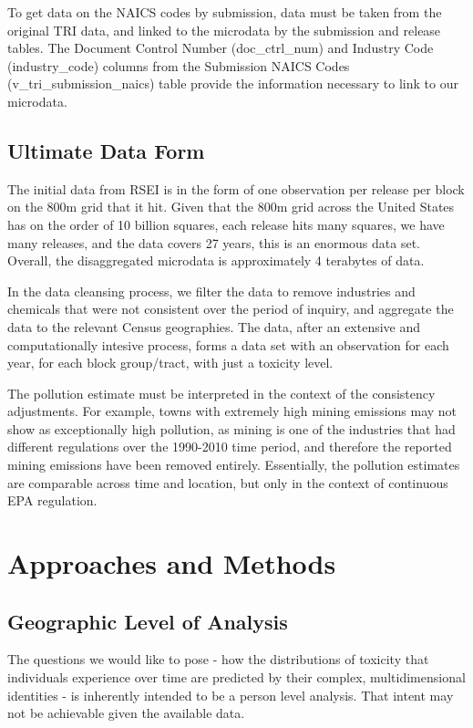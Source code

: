 \documentclass[12pt,twoside]{dukestatscithesis}
\theoremstyle{definition}
\theoremstyle{definition}
\theoremstyle{definition}
\theoremstyle{remark}
\begin{document}
To get data on the NAICS codes by submission, data must be taken from
the original TRI data, and linked to the microdata by the submission and
release tables. The Document Control Number (doc\_ctrl\_num) and
Industry Code (industry\_code) columns from the Submission NAICS Codes
(v\_tri\_submission\_naics) table provide the information necessary to
link to our microdata.

\section{Ultimate Data Form}\label{ultimate-data-form}

The initial data from RSEI is in the form of one observation per release
per block on the 800m grid that it hit. Given that the 800m grid across
the United States has on the order of 10 billion squares, each release
hits many squares, we have many releases, and the data covers 27 years,
this is an enormous data set. Overall, the disaggregated microdata is
approximately 4 terabytes of data.

In the data cleansing process, we filter the data to remove industries
and chemicals that were not consistent over the period of inquiry, and
aggregate the data to the relevant Census geographies. The data, after
an extensive and computationally intesive process, forms a data set with
an observation for each year, for each block group/tract, with just a
toxicity level.

The pollution estimate must be interpreted in the context of the
consistency adjustments. For example, towns with extremely high mining
emissions may not show as exceptionally high pollution, as mining is one
of the industries that had different regulations over the 1990-2010 time
period, and therefore the reported mining emissions have been removed
entirely. Essentially, the pollution estimates are comparable across
time and location, but only in the context of continuous EPA regulation.

\chapter{Approaches and Methods}\label{ref-labels}

\section{Geographic Level of
Analysis}\label{geographic-level-of-analysis}

The questions we would like to pose - how the distributions of toxicity
that individuals experience over time are predicted by their complex,
multidimensional identities - is inherently intended to be a person
level analysis. That intent may not be achievable given the available
data.
\end{document}
